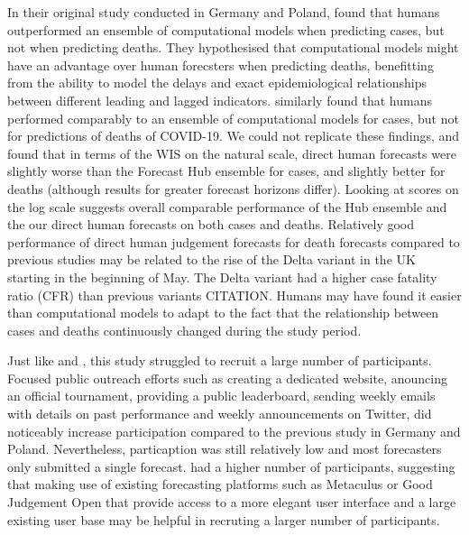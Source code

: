 \documentclass[10pt,a4paper,twocolumn]{article}
\begin{document}

In their original study conducted in Germany and Poland, \citet{bosseComparingHumanModelbased2022} found that humans outperformed an ensemble of computational models when predicting cases, but not when predicting deaths. They hypothesised that computational models might have an advantage over human forecsters when predicting deaths, benefitting from the ability to model the delays and exact epidemiological relationships between different leading and lagged indicators. \citet{mcandrewChimericForecastingCombining2022} similarly found that humans performed comparably to an ensemble of computational models for cases, but not for predictions of deaths of COVID-19. We could not replicate these findings, and found that in terms of the WIS on the natural scale, direct human forecasts were slightly worse than the Forecast Hub ensemble for cases, and slightly better for deaths (although results for greater forecast horizons differ). Looking at scores on the log scale suggests overall comparable performance of the Hub ensemble and the our direct human forecasts on both cases and deaths. Relatively good performance of direct human judgement forecasts for death forecasts compared to previous studies may be related to the rise of the Delta variant in the UK starting in the beginning of May. The Delta variant had a higher case fatality ratio (CFR) than previous variants CITATION. Humans may have found it easier than computational models to adapt to the fact that the relationship between cases and deaths continuously changed during the study period. 


Just like \citet{bosseComparingHumanModelbased2022} and \citet{farrowHumanJudgmentApproach2017}, this study struggled to recruit a large number of participants. Focused public outreach efforts such as creating a dedicated website, anouncing an official tournament, providing a public leaderboard, sending weekly emails with details on past performance and weekly announcements on Twitter, did noticeably increase participation compared to the previous study in Germany and Poland. Nevertheless, particaption was still relatively low and most forecasters only submitted a single forecast. \citet{mcandrewChimericForecastingCombining2022} had a higher number of participants, suggesting that making use of existing forecasting platforms such as Metaculus or Good Judgement Open that provide access to a more elegant user interface and a large existing user base may be helpful in recruting a larger number of participants. 
\end{document}
